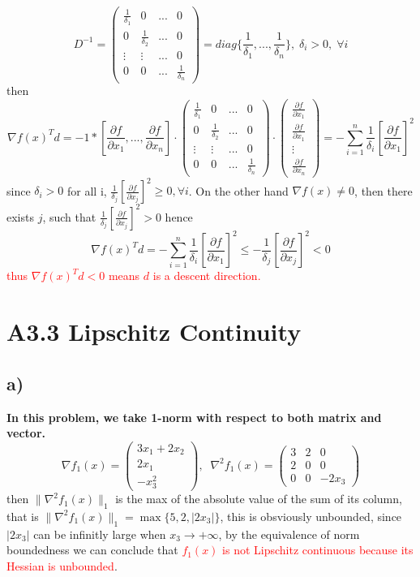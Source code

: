 \documentclass{article}
\newcommand{\subs}[1]{\subsection*{#1}}
\newcommand{\secs}[1]{\section*{#1}}
\begin{document}
\[
D^{-1}=\begin{pmatrix}
    \frac{1}{\delta_1} & 0 & ... & 0\\
 0 & \frac{1}{\delta_2} & ... & 0\\
 \vdots & \vdots & ... & 0\\
  0 & 0 & ... &\frac{1}{\delta_n}
\end{pmatrix} = diag\{\frac{1}{\delta_1},...,\frac{1}{\delta_n}\},\; \delta_i > 0,\;\forall i
\]
then\[
    \nabla f(x)^T d  = -1*\left[\frac{\partial f}{\partial x_1},...,\frac{\partial f}{\partial x_n}\right]\cdot 
    \begin{pmatrix}
        \frac{1}{\delta_1} & 0 & ... & 0\\
     0 & \frac{1}{\delta_2} & ... & 0\\
     \vdots & \vdots & ... & 0\\
      0 & 0 & ... &\frac{1}{\delta_n}
    \end{pmatrix}\cdot
    \begin{pmatrix}
        \frac{\partial f}{\partial x_1}\\
        \frac{\partial f}{\partial x_1}\\
        \vdots \\
        \frac{\partial f}{\partial x_n}
    \end{pmatrix} = -\sum_{i=1}^{n}\frac{1}{\delta_i} \left[\frac{\partial f}{\partial x_1}\right]^2
\]
since $\delta_i>0$ for all i, $\displaystyle \frac{1}{\delta_j} \left[\frac{\partial f}{\partial x_j}\right]^2 \geq 0, \forall i$.  On the other hand $\nabla f(x) \neq 0$, then there exists $j$, such that $\frac{1}{\delta_j} \left[\frac{\partial f}{\partial x_j}\right]^2 >0$
hence 
\[
    \nabla f(x)^T d = -\sum_{i=1}^{n}\frac{1}{\delta_i} \left[\frac{\partial f}{\partial x_1}\right]^2 \leq 
    -\frac{1}{\delta_j} \left[\frac{\partial f}{\partial x_j}\right]^2 < 0
\]
\textcolor{red}{thus $\nabla f(x)^T d <0$ means $d$ is a descent direction.}



\secs{A3.3 Lipschitz Continuity}
\subs{a)}
\textbf{In this problem, we take 1-norm with respect to both matrix and vector.}
\[
\nabla f_1(x) = \begin{pmatrix}
    3x_1+2x_2\\
    2x_1\\
    -x_3^2
\end{pmatrix},\;\;
\nabla^2 f_1(x) = \begin{pmatrix}
    3 & 2 & 0\\
    2 & 0 & 0\\
    0 & 0 & -2x_3
\end{pmatrix}
\]
then $\|\nabla^2 f_1(x)\|_1$ is the max of the absolute value of the sum of its column, that is $\|\nabla^2 f_1(x)\|_1 = \max \{5,2,|2x_3|\}$, this is obsviously unbounded, since $|2x_3|$ can be infinitly large when $x_3 \rightarrow +\infty$, by the equivalence of norm boundedness we can conclude that \textcolor{red}{$f_1(x)$ is not Lipschitz continuous because its Hessian is unbounded}.
\end{document}
